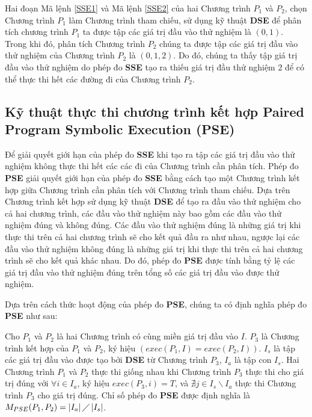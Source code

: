 Hai đoạn Mã lệnh \ref{SSE1} và Mã lệnh \ref{SSE2} của hai Chương trình $P_{1}$ và $P_{2}$, chọn Chương trình $P_{1}$ làm Chương trình tham chiếu, sử dụng kỹ thuật \textbf{DSE} để phân tích chương trình $P_{1}$ ta được tập các giá trị đầu vào thử nghiệm là ${(0, 1)}$. Trong khi đó, phân tích Chương trình $P_{2}$ chúng ta được tập các giá trị đầu vào thử nghiệm của Chương trình $P_{2}$  là ${(0, 1, 2)}$. Do đó, chúng ta thấy tập giá trị đầu vào thử nghiệm do phép đo \textbf{SSE} tạo ra thiếu giá trị đầu thử nghiệm $2$ để có thể thực thi hết các đường đi của Chương trình $P_{2}$.

\subsection{Kỹ thuật thực thi chương trình kết hợp Paired Program Symbolic Execution (PSE)}
Để giải quyết giới hạn của phép đo \textbf{SSE} khi tạo ra tập các giá trị đầu vào thử nghiệm không thực thi hết các các đi của Chương trình cần phân tích. Phép đo \textbf{PSE} giải quyết giới hạn của phép đo \textbf{SSE} bằng cách tạo một Chương trình kết hợp giữa Chương trình cần phân tích với Chương trình tham chiếu. Dựa trên Chương trình kết hợp sử dụng kỹ thuật \textbf{DSE} để tạo ra đầu vào thử nghiệm cho cả hai chương trình, các đầu vào thử nghiệm này bao gồm các đầu vào thử nghiệm đúng và không đúng. Các đầu vào thử nghiệm đúng là những giá trị khi thực thi trên cả hai chương trình sẽ cho kết quả đầu ra như nhau, ngược lại các đầu vào thử nghiệm không đúng là những giá trị khi thực thi trên cả hai chương trình sẽ cho kết quả khác nhau. Do đó, phép đo \textbf{PSE} được tính bằng tỷ lệ các giá trị đầu vào thử nghiệm đúng trên tổng số các giá trị đầu vào được thử nghiệm. 



Dựa trên cách thức hoạt động của phép đo \textbf{PSE}, chúng ta có định nghĩa phép đo \textbf{PSE} như sau:
\begin{definition}
	Cho $P_{1}$ và $P_{2}$ là hai Chương trình có cùng miền giá trị đầu vào $I$. $P_{3}$ là Chương trình
	kết hợp của $P_{1}$ và $P_{2}$, ký hiệu $(exec(P_{1}, I) =  exec(P_{2}, I))$.  $I_{s}$ là tập các giá trị đầu vào được tạo bởi \textbf{DSE} từ Chương trình $P_{3}$, $I_{a}$ là tập con $I_{s}$. Hai Chương trình $P_{1}$ và $P_{2}$ thực thi giống nhau khi Chương trình $P_{3}$ thực thi cho giá trị đúng với $\forall i \in I_{a}$, ký hiệu $exec(P_{3}, i) = T$, và $\nexists j \in I_{s} \backslash I_{a}$ thực thi Chương trình $P_{3}$ cho giá trị đúng. Chỉ số phép đo \textbf{PSE} được định nghĩa là $M_{PSE}(P_{1}, P_{2}) = \left|I_{a}\right| \diagup \left|I_{s}\right| $.
\end{definition}


